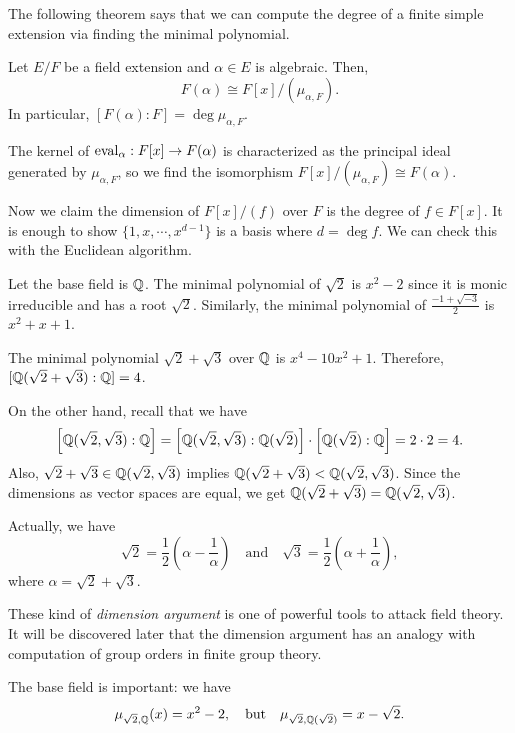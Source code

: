 \documentclass{../exp}
\begin{document}
The following theorem says that we can compute the degree of a finite simple extension via finding the minimal polynomial.
\begin{thm}
Let $E/F$ be a field extension and $\alpha\in E$ is algebraic.
Then,
\[F(\alpha)\cong F[x]/(\mu_{\alpha,F}).\]
In particular, $[F(\alpha):F]=\deg\mu_{\alpha,F}$.
\end{thm}
\begin{pf}
The kernel of $\eval_\alpha:F[x]\to F(\alpha)$ is characterized as the principal ideal generated by $\mu_{\alpha,F}$, so we find the isomorphism $F[x]/(\mu_{\alpha,F})\cong F(\alpha)$.

Now we claim the dimension of $F[x]/(f)$ over $F$ is the degree of $f\in F[x]$.
It is enough to show $\{1,x,\cdots,x^{d-1}\}$ is a basis where $d=\deg f$.
We can check this with the Euclidean algorithm.
\end{pf}


\begin{ex}
Let the base field is $\mathbb{Q}$.
The minimal polynomial of $\sqrt2$ is $x^2-2$ since it is monic irreducible and has a root $\sqrt2$.
Similarly, the minimal polynomial of $\frac{-1+\sqrt{-3}}2$ is $x^2+x+1$.
\end{ex}
\begin{ex}
The minimal polynomial $\sqrt2+\sqrt3$ over $\mathbb{Q}$ is $x^4-10x^2+1$.
Therefore, $[\mathbb{Q}(\sqrt2+\sqrt3):\mathbb{Q}]=4$.

On the other hand, recall that we have
\[\left[\mathbb{Q}(\sqrt2,\sqrt3):\mathbb{Q}\right]=\left[\mathbb{Q}(\sqrt2,\sqrt3):\mathbb{Q}(\sqrt2)\right]\cdot\left[\mathbb{Q}(\sqrt2):\mathbb{Q}\right]=2\cdot2=4.\]
Also, $\sqrt2+\sqrt3\in\mathbb{Q}(\sqrt2,\sqrt3)$ implies $\mathbb{Q}(\sqrt2+\sqrt3)<\mathbb{Q}(\sqrt2,\sqrt3)$.
Since the dimensions as vector spaces are equal, we get $\mathbb{Q}(\sqrt2+\sqrt3)=\mathbb{Q}(\sqrt2,\sqrt3)$.

Actually, we have
\[\sqrt2=\frac12\left(\alpha-\frac1\alpha\right)\quad\text{and}\quad\sqrt3=\frac12\left(\alpha+\frac1\alpha\right),\]
where $\alpha=\sqrt2+\sqrt3$.

These kind of \emph{dimension argument} is one of powerful tools to attack field theory.
It will be discovered later that the dimension argument has an analogy with computation of group orders in finite group theory.
\end{ex}

\begin{ex}
The base field is important: we have
\[\mu_{\sqrt2,\mathbb{Q}}(x)=x^2-2,\quad\text{but}\quad\mu_{\sqrt2,\mathbb{Q}(\sqrt2)}=x-\sqrt2.\]
\end{ex}
\end{document}
